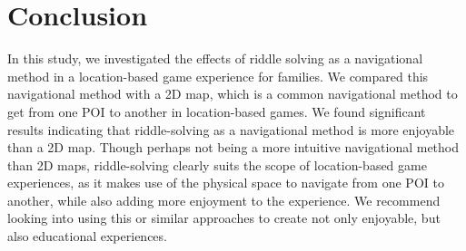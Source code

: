 \section{Conclusion}
In this study, we investigated the effects of riddle solving as a navigational method in a location-based game experience for families. We compared this navigational method with a 2D map, which is a common navigational method to get from one POI to another in location-based games. We found significant results indicating that riddle-solving as a navigational method is more enjoyable than a 2D map. Though perhaps not being a more intuitive navigational method than 2D maps, riddle-solving clearly suits the scope of location-based game experiences, as it makes use of the physical space to navigate from one POI to another, while also adding more enjoyment to the experience. We recommend looking into using this or similar approaches to create not only enjoyable, but also educational experiences. 